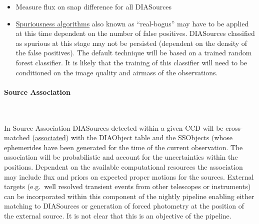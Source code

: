 \begin{itemize}
\item Measure flux on snap difference for all DIASources
\item \hyperref[sec:acSpuriousnessAlgorithms]{Spuriousness algorithms} also known as ``real-bogus'' may have to be applied at this time dependent on the number of false positives. DIASources classified as spurious at this stage may not be persisted (dependent on the density of the false positives). The default technique will be based on a trained random forest classifier. It is likely that the training of this classifier will need to be conditioned on the image quality and airmass of the observations.
\end{itemize}

\paragraph{Source Association}~

In Source Association DIASources detected within a given CCD will be cross-matched (\hyperref[sec:acDIAObjectGeneration]{associated}) with the DIAObject table and the SSObjects (whose ephemerides have been generated for the time of the current observation. The association will be probabilistic  and account for the uncertainties within the positions. Dependent on the available computational resources the association may include flux and priors on expected proper motions for the sources. External targets (e.g.\ well resolved transient events from other telescopes or instruments) can be incorporated within this component of the nightly pipeline enabling either matching to DIASources or generation of forced photometry at the position of the external source. It is not clear that this is an objective of the pipeline. 


